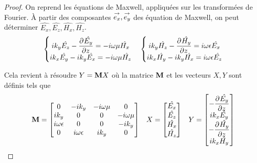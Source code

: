         \begin{proof}
            On reprend les équations de Maxwell, appliquées sur les transformées de Fourier. À partir des composantes \(\vect{e_x},\vect{e_y}\) des équation de Maxwell, on peut déterminer \(\hat{E_x},\hat{E_z},\hat{H_x},\hat{H_z}\).
            \begin{align*}
                \left\lbrace
                \begin{matrix}
                    ik_y \hat{E_z}  - \ddr{z}{\hat{E_y}} = -i \w \mu \hat{H_x}
                    \\
                    ik_x \hat{E_y} - ik_y \hat{E_x} = -i\w \mu \hat{H_z}
                \end{matrix}
                \right. \quad
                \left\lbrace
                \begin{matrix}
                    ik_y \hat{H_z}  - \ddr{z}{\hat{H_y}} = i \w \eps \hat{E_x}
                    \\
                    ik_x \hat{H_y} - ik_y \hat{H_x} = i\w \eps \hat{E_z}
                \end{matrix}
                \right.
            \end{align*}

            Cela revient à résoudre \(Y = \mat{M}X\) où la matrice \(\mat{M}\) et les vecteurs \(X, Y\) sont définis tels que
            \begin{align*}
              \mat{M} =
              \begin{bmatrix}
              0 & -ik_y & -i\w\mu & 0
              \\
              ik_y & 0 & 0 & -i\w\mu
              \\
              i\w\eps & 0 & 0 & -ik_y
              \\
              0 & i\w\eps & ik_y & 0
              \end{bmatrix}
              &&
              X =
              \begin{bmatrix}
                \hat{E_x}\\
                \hat{E_z}\\
                \hat{H_x}\\
                \hat{H_z}
              \end{bmatrix}
              &&
              Y =
              \begin{bmatrix}
                -\ddr{z}{\hat{E_y}}\\
                ik_x\hat{E_y}\\
                -\ddr{z}{\hat{H_y}}\\
                ik_x\hat{H_y}
              \end{bmatrix}
            \end{align*}


\end{proof}
